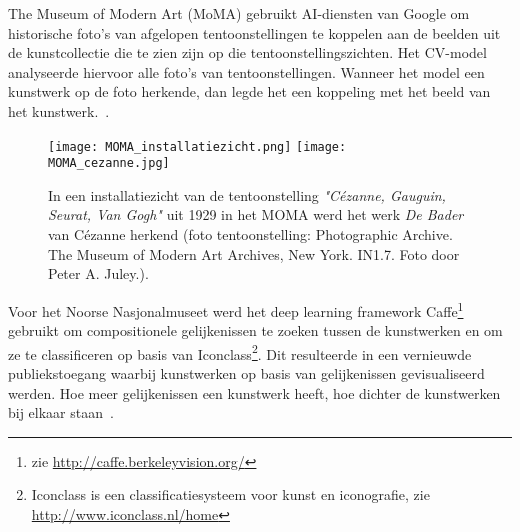 The Museum of Modern Art (MoMA) gebruikt AI-diensten van Google om historische foto’s van afgelopen tentoonstellingen te koppelen aan de beelden uit de kunstcollectie die te zien zijn op die tentoonstellingszichten. Het CV-model analyseerde hiervoor alle foto’s van tentoonstellingen. Wanneer het model een kunstwerk op de foto herkende, dan legde het een koppeling met het beeld van het kunstwerk.~\autocite{MOMA2018?}. %

\begin{figure}
	\centering
	\texttt{[image: MOMA\_installatiezicht.png]}\hfill
	\texttt{[image: MOMA\_cezanne.jpg]}\hfill
	\caption[Installatiezicht van MOMA waarin de AI-diensten van Google Arts \& Culture een schilderij van Cézanne herkennen]{In een installatiezicht van de tentoonstelling \textit{"Cézanne, Gauguin, Seurat, Van Gogh"} uit 1929 in het MOMA werd het werk \textit{De Bader} van Cézanne herkend (foto tentoonstelling: Photographic Archive. The Museum of Modern Art Archives, New York. IN1.7. Foto door Peter A. Juley.).}
\end{figure}

Voor het Noorse Nasjonalmuseet werd het deep learning framework Caffe\footnote{zie \url{http://caffe.berkeleyvision.org/}} gebruikt om compositionele gelijkenissen te zoeken tussen de kunstwerken en om ze te classificeren op basis van Iconclass\footnote{Iconclass is een classificatiesysteem voor kunst en iconografie, zie \url{http://www.iconclass.nl/home}}. Dit resulteerde in een vernieuwde publiekstoegang waarbij kunstwerken op basis van gelijkenissen gevisualiseerd werden. Hoe meer gelijkenissen een kunstwerk heeft, hoe dichter de kunstwerken bij elkaar staan~\autocite{Nasjonalmuseet2017?}. %

